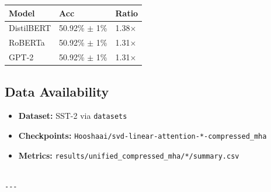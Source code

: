 \begin{table}[H]
\centering
\small
\begin{tabular}{lll}
\toprule
\textbf{Model} & \textbf{Acc} & \textbf{Ratio} \\
\midrule
DistilBERT & 50.92\% $\pm$ 1\% & 1.38$\times$ \\
RoBERTa & 50.92\% $\pm$ 1\% & 1.31$\times$ \\
GPT-2 & 50.92\% $\pm$ 1\% & 1.31$\times$ \\
\bottomrule
\end{tabular}
\end{table}

\subsection{Data Availability}

\begin{itemize}
\item \textbf{Dataset:} SST-2 via \texttt{datasets}
\item \textbf{Checkpoints:} \texttt{Hooshaai/svd-linear-attention-*-compressed\_mha}
\item \textbf{Metrics:} \texttt{results/unified\_compressed\_mha/*/summary.csv}
\end{itemize}
\begin{lstlisting}

---
\end{lstlisting}